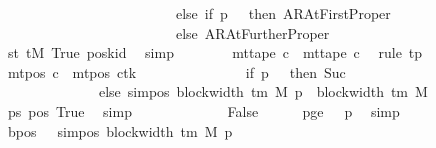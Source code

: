 \begin{isabellebody}
\ \ \ \ \ \ \ \ \ \ \ \ \ \ \ \ \ \ \ \ \ \ \ \ \ else\ if\ p\ {\isacharequal}{\kern0pt}\ {}\ then\ AR{\isacharunderscore}{\kern0pt}AtFirstProper\isanewline
\ \ \ \ \ \ \ \ \ \ \ \ \ \ \ \ \ \ \ \ \ \ \ \ \ else\ AR{\isacharunderscore}{\kern0pt}AtFurtherProper{\isacharparenright}{\kern0pt}{\isacharparenright}{\kern0pt}{\isachardoublequoteclose}\isanewline
\ \ \ \ \ \ \ \ \isamarkupfalse%
\ st\ tM{}\ True\ poskid\ \isamarkupfalse%
\ simp\isanewline
\ \ \ \ \ \ \isamarkupfalse%
\ {\isachardoublequoteopen}mt{\isacharunderscore}{\kern0pt}tape\ c{\isacharprime}{\kern0pt}{\isacharprime}{\kern0pt}\ {\isacharequal}{\kern0pt}\ mt{\isacharunderscore}{\kern0pt}tape\ c{\isacharprime}{\kern0pt}{\isachardoublequoteclose}\ \isamarkupfalse%
\ {\isacharparenleft}{\kern0pt}rule\ tp{\isacharparenright}{\kern0pt}\isanewline
\ \ \ \ \ \ \isamarkupfalse%
\ {\isachardoublequoteopen}mt{\isacharunderscore}{\kern0pt}pos\ c{\isacharprime}{\kern0pt}{\isacharprime}{\kern0pt}\ {\isacharequal}{\kern0pt}\ {\isacharparenleft}{\kern0pt}mt{\isacharunderscore}{\kern0pt}pos\ c{\isacharprime}{\kern0pt}{\isacharparenright}{\kern0pt}{\isacharparenleft}{\kern0pt}tk\ {\isacharcolon}{\kern0pt}{\isacharequal}{\kern0pt}\isanewline
\ \ \ \ \ \ \ \ \ \ \ \ \ \ if\ p\ {\isacharequal}{\kern0pt}\ {}\ then\ Suc\ {}\isanewline
\ \ \ \ \ \ \ \ \ \ \ \ \ \ else\ sim{\isacharunderscore}{\kern0pt}pos\ {\isacharparenleft}{\kern0pt}block{\isacharunderscore}{\kern0pt}width\ {\isacharparenleft}{\kern0pt}{\isasymGamma}{\isacharunderscore}{\kern0pt}tm\ M{\isacharparenright}{\kern0pt}{\isacharparenright}{\kern0pt}\ p\ {\isacharplus}{\kern0pt}\ block{\isacharunderscore}{\kern0pt}width\ {\isacharparenleft}{\kern0pt}{\isasymGamma}{\isacharunderscore}{\kern0pt}tm\ M{\isacharparenright}{\kern0pt}{\isacharparenright}{\kern0pt}{\isachardoublequoteclose}\isanewline
\ \ \ \ \ \ \ \ \isamarkupfalse%
\ ps\ pos{}\ True\ \isamarkupfalse%
\ simp\isanewline
\ \ \ \ \isamarkupfalse%
\isanewline
\ \ \isamarkupfalse%
\isanewline
\ \ \ \ \isamarkupfalse%
\ False\isanewline
\ \ \ \ \isamarkupfalse%
\ pge{}{\isacharcolon}{\kern0pt}\ {\isachardoublequoteopen}{}\ {\isasymle}\ p{\isachardoublequoteclose}\ \isamarkupfalse%
\ simp\isanewline
\ \ \ \ \isamarkupfalse%
\ bpos{\isacharcolon}{\kern0pt}\ {\isachardoublequoteopen}{}\ {\isacharless}{\kern0pt}\ sim{\isacharunderscore}{\kern0pt}pos\ {\isacharparenleft}{\kern0pt}block{\isacharunderscore}{\kern0pt}width\ {\isacharparenleft}{\kern0pt}{\isasymGamma}{\isacharunderscore}{\kern0pt}tm\ M{\isacharparenright}{\kern0pt}{\isacharparenright}{\kern0pt}\ p{\isachardoublequoteclose}\isanewline

\end{isabellebody}
